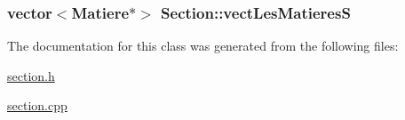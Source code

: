 \hypertarget{class_section_aa308cad9e1b9d45aa90544e26910e8fe}{
\subsubsection[{vect\+Les\+Matieres\+S}]{\setlength{\rightskip}{0pt plus 5cm}vector$<${\bf Matiere}$\ast$$>$ Section\+::vect\+Les\+Matieres\+S\hspace{0.3cm}{\ttfamily [private]}}}\label{class_section_aa308cad9e1b9d45aa90544e26910e8fe}


The documentation for this class was generated from the following files\+:\begin{DoxyCompactItemize}
\item 
\hyperlink{section_8h}{section.\+h}\item 
\hyperlink{section_8cpp}{section.\+cpp}\end{DoxyCompactItemize}

